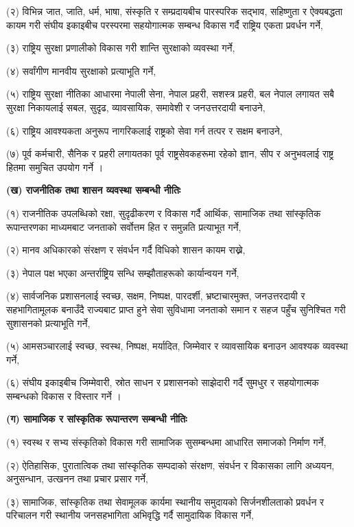 (२) विभिन्न जात, जाति, धर्म, भाषा, संस्कृति र सम्प्रदायबीच पारस्परिक सद्भाव, सहिष्णुता र ऐक्यबद्धता कायम गरी संघीय इकाइबीच परस्परमा सहयोगात्मक सम्बन्ध विकास गर्दै राष्ट्रिय एकता प्रवर्धन गर्ने,

(३) राष्ट्रिय सुरक्षा प्रणालीको विकास गरी शान्ति सुरक्षाको व्यवस्था गर्ने,

(४) सर्वांगीण मानवीय सुरक्षाको प्रत्याभूति गर्ने,

(५) राष्ट्रिय सुरक्षा नीतिका आधारमा नेपाली सेना, नेपाल प्रहरी, सशस्त्र प्रहरी, बल नेपाल लगायत सबै सुरक्षा निकायलाई सबल, सुदृढ, व्यावसायिक, समावेशी र जनउत्तरदायी बनाउने,

(६) राष्ट्रिय आवश्यकता अनुरूप नागरिकलाई राष्ट्रको सेवा गर्न तत्पर र सक्षम बनाउने,

(७) पूर्व कर्मचारी, सैनिक र प्रहरी लगायतका पूर्व राष्ट्रसेवकहरूमा रहेको ज्ञान, सीप र अनुभवलाई राष्ट्र हितमा समुचित उपयोग गर्ने ।

\textbf{(ख) राजनीतिक तथा शासन व्यवस्था सम्बन्धी नीतिः}

(१) राजनीतिक उपलब्धिको रक्षा, सुदृढीकरण र विकास गर्दै आर्थिक, सामाजिक तथा सांस्कृतिक रूपान्तरणका माध्यमबाट जनताको सर्वोत्तम हित र समुन्नति प्रत्याभूत गर्ने,

(२) मानव अधिकारको संरक्षण र संवर्धन गर्दै विधिको शासन कायम राख्ने,

(३) नेपाल पक्ष भएका अन्तर्राष्ट्रिय सन्धि सम्झौताहरूको कार्यान्वयन गर्ने,

(४) सार्वजनिक प्रशासनलाई स्वच्छ, सक्षम, निष्पक्ष, पारदर्शी, भ्रष्टाचारमुक्त, जनउत्तरदायी र सहभागितामूलक बनाउँदै राज्यबाट प्राप्त हुने सेवा सुविधामा जनताको समान र सहज पहुँच सुनिश्चित गरी सुशासनको प्रत्याभूति गर्ने,

(५) आमसञ्चारलाई स्वच्छ, स्वस्थ, निष्पक्ष, मर्यादित, जिम्मेवार र व्यावसायिक बनाउन आवश्यक व्यवस्था गर्ने,

(६) संघीय इकाइबीच जिम्मेवारी, स्रोत साधन र प्रशासनको साझेदारी गर्दै सुमधुर र सहयोगात्मक सम्बन्धको विकास र विस्तार गर्ने ।

\textbf{(ग) सामाजिक र सांस्कृतिक रूपान्तरण सम्बन्धी नीतिः}

(१) स्वस्थ र सभ्य संस्कृतिको विकास गरी सामाजिक सुसम्बन्धमा आधारित समाजको निर्माण गर्ने,

(२) ऐतिहासिक, पुरातात्विक तथा सांस्कृतिक सम्पदाको संरक्षण, संवर्धन र विकासका लागि अध्ययन, अनुसन्धान, उत्खनन तथा प्रचार प्रसार गर्ने,

(३) सामाजिक, सांस्कृतिक तथा सेवामूलक कार्यमा स्थानीय समुदायको सिर्जनशीलताको प्रवर्धन र परिचालन गरी स्थानीय जनसहभागिता अभिवृद्धि गर्दै सामुदायिक विकास गर्ने,

